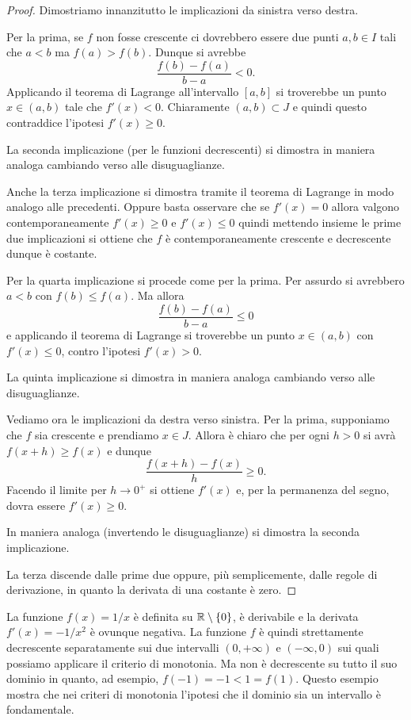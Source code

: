 \begin{proof}
\mymark{***}
Dimostriamo innanzitutto le implicazioni da sinistra verso destra.

Per la prima, se $f$ non fosse crescente ci dovrebbero essere due punti $a, b \in I$ tali che $a < b$ ma $f(a) > f(b)$.
Dunque si avrebbe
\[
  \frac{f(b) - f(a)}{b - a} < 0.
\]
Applicando il teorema di Lagrange all'intervallo $[a,b]$ si troverebbe un punto $x\in (a,b)$ tale che $f'(x) < 0$. Chiaramente $(a,b)\subset J$ e quindi questo contraddice l'ipotesi $f'(x) \ge 0$.

La seconda implicazione (per le funzioni decrescenti) si dimostra in maniera analoga cambiando verso alle disuguaglianze.

Anche la terza implicazione si dimostra tramite il teorema di Lagrange in modo analogo alle precedenti. Oppure basta osservare che se $f'(x)=0$ allora valgono contemporaneamente $f'(x)\ge 0$ e $f'(x)\le 0$ quindi mettendo insieme le prime due implicazioni si ottiene che $f$ è contemporaneamente crescente e decrescente dunque è costante.

Per la quarta implicazione si procede come per la prima. Per assurdo si  avrebbero $a<b$ con $f(b) \le f(a)$. Ma allora
\[
  \frac{f(b) - f(a)}{b-a} \le 0
\]
e applicando il teorema di Lagrange si troverebbe un punto $x\in (a,b)$ con $f'(x) \le 0$, contro l'ipotesi $f'(x) > 0$.

La quinta implicazione si dimostra in maniera analoga cambiando verso alle disuguaglianze.

Vediamo ora le implicazioni da destra verso sinistra.
Per la prima, supponiamo che $f$ sia crescente e prendiamo $x\in J$. Allora è chiaro che per ogni $h>0$ si avrà $f(x+h) \ge f(x)$ e dunque
\[
  \frac{f(x+h)- f(x)}{h} \ge 0.
\]
Facendo il limite per $h \to 0^+$ si ottiene $f'(x)$ e, per la permanenza del segno, dovra essere $f'(x) \ge 0$.

In maniera analoga (invertendo le disuguaglianze) si dimostra la seconda implicazione.

La terza discende dalle prime due oppure, più semplicemente, dalle regole di derivazione, in quanto la derivata di una costante è zero.
\end{proof}

\begin{example}
La funzione $f(x) = 1/x$ è definita su $\mathbb R \setminus {\left\{ 0 \right\}}$, è derivabile
e la derivata $f'(x) = -1/x^2$ è ovunque negativa. La funzione $f$ è quindi strettamente
decrescente separatamente sui due intervalli $(0,+\infty)$ e $(-\infty,0)$ sui quali
possiamo applicare il criterio di monotonia. Ma non è
decrescente su tutto il suo dominio in quanto, ad esempio, $f(-1) = -1 < 1 = f(1)$.
Questo esempio mostra che nei criteri di monotonia l'ipotesi che il dominio sia un intervallo
è fondamentale.
\end{example}

